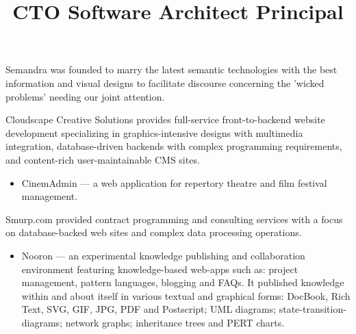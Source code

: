 \begin{resume}


\title{ CTO }
\begin{position}
Semandra was founded to marry the latest semantic technologies 
with the best information and visual designs to facilitate 
discourse concerning the 'wicked problems' needing our joint attention.
\end{position}


\title{ Software Architect }
\begin{position}
Cloudscape Creative Solutions provides full-service front-to-backend
website development specializing in graphics-intensive designs with
multimedia integration, database-driven backends with complex
programming requirements, and content-rich user-maintainable CMS
sites.

\begin{itemize}
  \item CinemAdmin --- a web application for repertory theatre and film festival management.
\end{itemize}

\end{position}


\title{ Principal }

\begin{position}
Smurp.com provided contract programming and consulting services with a focus
on database-backed web sites and complex data processing operations.

\begin{itemize}
  \item Nooron --- an experimental knowledge publishing and collaboration
    environment featuring knowledge-based web-apps such as:
    project management, pattern languages, blogging and FAQs.
    It published knowledge within and about itself in various textual and graphical forms:
    DocBook, Rich Text, SVG, GIF, JPG, PDF and Postscript;
    UML diagrams; state-transition-diagrams; network graphs; 
    inheritance trees and PERT charts.


\end{itemize}
\end{position}
\end{resume}
